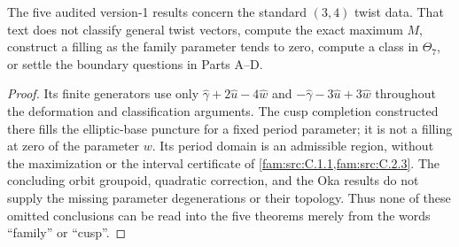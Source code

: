 \begin{proposition}\label{push:src:E.3.3}
The five audited version-1 results concern the standard
$(3,4)$ twist data.  That text does not classify general twist
vectors, compute the exact maximum $M$, construct a filling as
the family parameter tends to zero, compute a class in
$\Theta_7$, or settle the boundary questions in Parts A--D.
\end{proposition}

\begin{proof}
Its finite generators use only
$\widehat\gamma+2\widehat u-4\widehat w$ and
$-\widehat\gamma-3\widehat u+3\widehat w$ throughout the
deformation and classification arguments.  The cusp completion
constructed there fills the elliptic-base puncture for a fixed
period parameter; it is not a filling at zero of the parameter
$w$.  Its period domain is an admissible region, without the
maximization or the interval certificate of \cref{fam:src:C.1.1,fam:src:C.2.3}.  The concluding
orbit groupoid, quadratic correction, and the Oka results do not
supply the missing parameter degenerations or their topology.
Thus none of these omitted conclusions can be read into the
five theorems merely from the words ``family'' or ``cusp''.
\end{proof}

